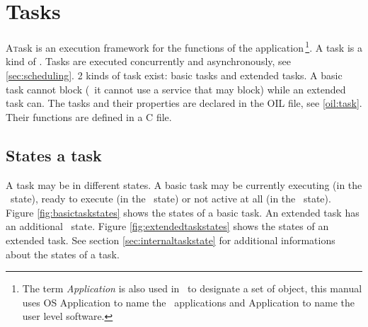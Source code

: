 
\chapter{Tasks}
\label{chap:tasks}

\lettrine{A} task is an execution framework for the functions of the application\,\footnote{The term {\em Application} is also used in \autosar\ to designate a set of object, this manual uses OS Application to name the \autosar\ applications and Application to name the user level software.}. A task is a kind of \process. Tasks are executed concurrently and asynchronously, see \ref{sec:scheduling}. 2 kinds of task exist: basic tasks and extended tasks. A basic task cannot block (\ie\ it cannot use a service that may block) while an extended task can.
The tasks and their properties are declared in the OIL file, see \ref{oil:task}. Their functions are defined in a C file.

\section{States a task}
\label{sec:taskstate}

A task may be in different states. A basic task may be currently executing (in the \RUNNING\ state), ready to execute (in the \READY\ state) or not active at all (in the \SUSPENDED\ state). Figure \ref{fig:basictaskstates} shows the states of a basic task. An extended task has an additional \WAITING\ state.  Figure \ref{fig:extendedtaskstates} shows the states of an extended task. See section \ref{sec:internaltaskstate} for additional informations about the states of a task.

